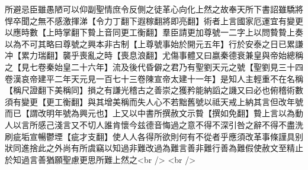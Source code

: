 所避忌臣雖愚陋可以仰副聖情庶令反側之徒革心向化上然之故奉天所下書詔雖驕將悍卒聞之無不感激揮涕【令力丁翻下遐稼翻將即亮翻】術者上言國家厄運宜有變更以應時數【上時掌翻下䞇上音同更工衡翻】羣臣請更加尊號一二字上以問䞇䞇上奏以為不可其略曰尊號之興本非古制【上尊號事始於開元五年】行於安泰之日已累謙冲【累力瑞翻】襲乎喪亂之時【喪息浪翻】尤傷事體又曰嬴秦德衰兼皇與帝始總稱之【見七卷秦始皇二十六年】流及後代昏僻之君乃有聖劉天元之號【聖劉見三十四卷漢哀帝建平二年天元見一百七十三卷陳宣帝太建十一年】是知人主輕重不在名稱【稱尺證翻下美稱同】損之有謙光稽古之善崇之獲矜能納謟之譏又曰必也俯稽術數須有變更【更工衡翻】與其增美稱而失人心不若黜舊號以祗天戒上納其言但改年號而已【謂改明年號為興元也】上又以中書所撰赦文示䞇【撰如免翻】䞇上言以為動人以言所感己淺言又不切人誰肯懷今兹德音悔過之意不得不深引咎之辭不得不盡洗刷疵垢宣暢鬱堙【疵才支翻】使人人各得所欲則何有不從者乎應須改革事條謹具别狀同進捨此之外尚有所虞竊以知過非難改過為難言善非難行善為難假使赦文至精止於知過言善猶願聖慮更思所難上然之<br />
<br />

